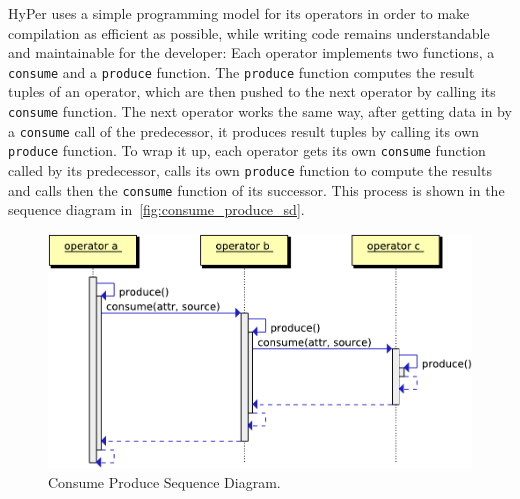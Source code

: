 HyPer uses a simple programming model for its operators in order to make  compilation as efficient as possible, while writing code remains understandable and maintainable for the developer: Each operator implements two functions, a \texttt{consume} and a \texttt{produce} function. The \texttt{produce} function computes the result tuples of an operator, which are then pushed to the next operator by calling its \texttt{consume} function. The next operator works the same way, after getting data in by a \texttt{consume} call of the predecessor, it produces result tuples by calling its own \texttt{produce} function. To wrap it up, each operator gets its own \texttt{consume} function called by its predecessor, calls its own \texttt{produce} function to compute the results and calls then the \texttt{consume} function of its successor. This process is shown in the sequence diagram in~\autoref{fig:consume_produce_sd}.


\begin{figure}[htsb]
  \centering
  \includegraphics[scale=0.6]{figures/consume_produce}
  \caption[Consume Produce Sequence Diagram]{Consume Produce Sequence Diagram.}\label{fig:consume_produce_sd}
\end{figure}


